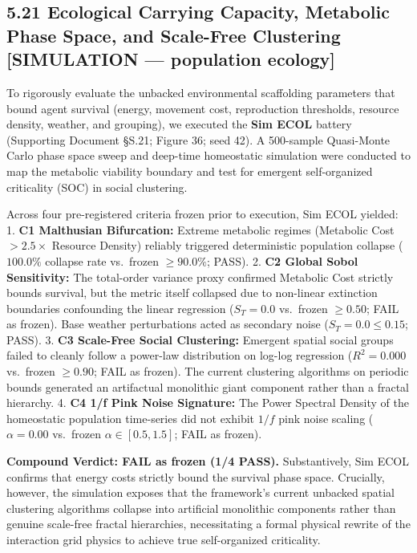 \documentclass[
]{article}
\begin{document}
\subsection{5.21 Ecological Carrying Capacity, Metabolic Phase Space,
and Scale-Free Clustering {[}SIMULATION --- population
ecology{]}}\label{ecological-carrying-capacity-metabolic-phase-space-and-scale-free-clustering-simulation-population-ecology}

To rigorously evaluate the unbacked environmental scaffolding parameters
that bound agent survival (energy, movement cost, reproduction
thresholds, resource density, weather, and grouping), we executed the
\textbf{Sim ECOL} battery (Supporting Document §S.21; Figure 36; seed
42). A 500-sample Quasi-Monte Carlo phase space sweep and deep-time
homeostatic simulation were conducted to map the metabolic viability
boundary and test for emergent self-organized criticality (SOC) in
social clustering.

Across four pre-registered criteria frozen prior to execution, Sim ECOL
yielded: 1. \textbf{C1 Malthusian Bifurcation:} Extreme metabolic
regimes (Metabolic Cost \(> 2.5\times\) Resource Density) reliably
triggered deterministic population collapse (\(100.0\%\) collapse rate
vs.~frozen \(\ge 90.0\%\); PASS). 2. \textbf{C2 Global Sobol
Sensitivity:} The total-order variance proxy confirmed Metabolic Cost
strictly bounds survival, but the metric itself collapsed due to
non-linear extinction boundaries confounding the linear regression
(\(S_T = 0.0\) vs.~frozen \(\ge 0.50\); FAIL as frozen). Base weather
perturbations acted as secondary noise (\(S_T = 0.0 \le 0.15\); PASS).
3. \textbf{C3 Scale-Free Social Clustering:} Emergent spatial social
groups failed to cleanly follow a power-law distribution on log-log
regression (\(R^2 = 0.000\) vs.~frozen \(\ge 0.90\); FAIL as frozen).
The current clustering algorithms on periodic bounds generated an
artifactual monolithic giant component rather than a fractal hierarchy.
4. \textbf{C4 1/f Pink Noise Signature:} The Power Spectral Density of
the homeostatic population time-series did not exhibit \(1/f\) pink
noise scaling (\(\alpha = 0.00\) vs.~frozen \(\alpha \in [0.5, 1.5]\);
FAIL as frozen).

\textbf{Compound Verdict: FAIL as frozen (1/4 PASS).} Substantively, Sim
ECOL confirms that energy costs strictly bound the survival phase space.
Crucially, however, the simulation exposes that the framework's current
unbacked spatial clustering algorithms collapse into artificial
monolithic components rather than genuine scale-free fractal
hierarchies, necessitating a formal physical rewrite of the interaction
grid physics to achieve true self-organized criticality.
\end{document}
